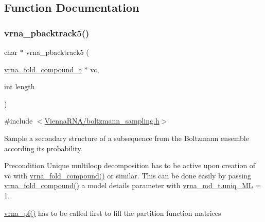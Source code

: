 \subsection{Function Documentation}
\mbox{\label{group__subopt__stochbt_ga347375a4da8bdff74639529847f97d4f}} 
\subsubsection{\texorpdfstring{vrna\+\_\+pbacktrack5()}{vrna\_pbacktrack5()}}
{\footnotesize\ttfamily char $\ast$ vrna\+\_\+pbacktrack5 (\begin{DoxyParamCaption}\item[{\hyperlink{group__fold__compound_ga1b0cef17fd40466cef5968eaeeff6166}{vrna\+\_\+fold\+\_\+compound\+\_\+t} $\ast$}]{vc,  }\item[{int}]{length }\end{DoxyParamCaption})}



{\ttfamily \#include $<$\hyperlink{boltzmann__sampling_8h}{Vienna\+R\+N\+A/boltzmann\+\_\+sampling.\+h}$>$}



Sample a secondary structure of a subsequence from the Boltzmann ensemble according its probability. 

\begin{DoxyPrecond}{Precondition}
Unique multiloop decomposition has to be active upon creation of {\ttfamily vc} with \hyperlink{group__fold__compound_ga6601d994ba32b11511b36f68b08403be}{vrna\+\_\+fold\+\_\+compound()} or similar. This can be done easily by passing \hyperlink{group__fold__compound_ga6601d994ba32b11511b36f68b08403be}{vrna\+\_\+fold\+\_\+compound()} a model details parameter with \hyperlink{group__model__details_ade065b814a4e2e72ead93ab502613ed2}{vrna\+\_\+md\+\_\+t.\+uniq\+\_\+\+ML} = 1. 

\hyperlink{group__pf__fold_ga29e256d688ad221b78d37f427e0e99bc}{vrna\+\_\+pf()} has to be called first to fill the partition function matrices
\end{DoxyPrecond}

